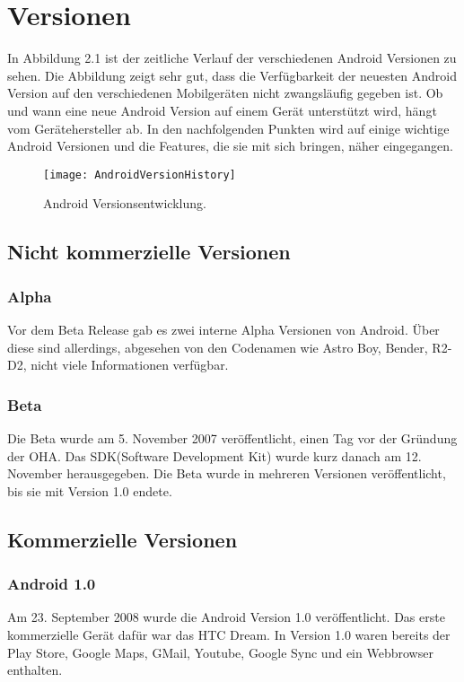 \section{Versionen}
In Abbildung 2.1 ist der zeitliche Verlauf der verschiedenen Android Versionen zu sehen. Die Abbildung zeigt sehr gut, dass die Verfügbarkeit der neuesten Android Version auf den verschiedenen Mobilgeräten nicht zwangsläufig gegeben ist. Ob und wann eine neue Android Version auf einem Gerät unterstützt wird, hängt vom Gerätehersteller ab. In den nachfolgenden Punkten wird auf einige wichtige Android Versionen und die Features, die sie mit sich bringen, näher eingegangen.

\begin{figure}
\centering
\texttt{[image: AndroidVersionHistory]}
\caption{Android Versionsentwicklung.\cite{6}}
\label{fig:AndroidVersionHistory}
\end{figure}

\subsection{Nicht kommerzielle Versionen}
\subsubsection{Alpha}
Vor dem Beta Release gab es zwei interne Alpha Versionen von Android. Über diese sind allerdings, abgesehen von den Codenamen wie Astro Boy, Bender, R2-D2, nicht viele Informationen verfügbar.\cite{7}

\subsubsection{Beta}
Die Beta wurde am 5. November 2007 veröffentlicht, einen Tag vor der Gründung der OHA. Das SDK(Software Development Kit) wurde kurz danach am 12. November herausgegeben. Die Beta wurde in mehreren Versionen veröffentlicht, bis sie mit Version 1.0 endete.\cite{8}

\subsection{Kommerzielle Versionen}
\subsubsection{Android 1.0}
Am 23. September 2008 wurde die Android Version 1.0 veröffentlicht. Das erste kommerzielle Gerät dafür war das HTC Dream. In Version 1.0 waren bereits der Play Store, Google Maps, GMail, Youtube, Google Sync und ein Webbrowser enthalten.\cite{9}

